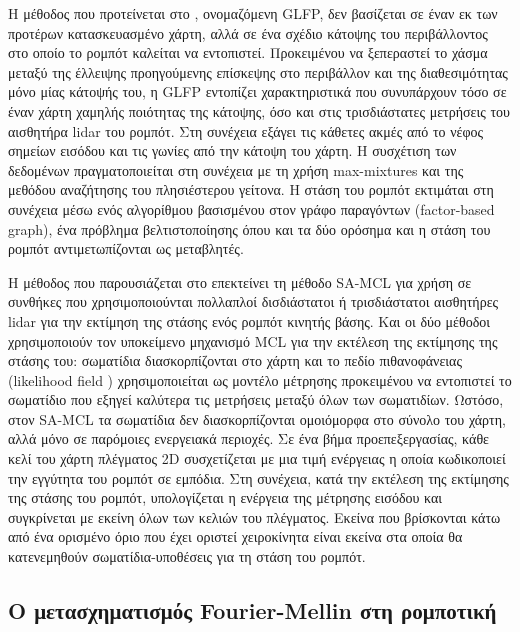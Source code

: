 Η μέθοδος που προτείνεται στο \cite{Wang2019a}, ονομαζόμενη GLFP, δεν βασίζεται
σε έναν εκ των προτέρων κατασκευασμένο χάρτη, αλλά σε ένα σχέδιο κάτοψης του
περιβάλλοντος στο οποίο το ρομπότ καλείται να εντοπιστεί. Προκειμένου να
ξεπεραστεί το χάσμα μεταξύ της έλλειψης προηγούμενης επίσκεψης στο περιβάλλον
και της διαθεσιμότητας μόνο μίας κάτοψής του, η GLFP εντοπίζει χαρακτηριστικά
που συνυπάρχουν τόσο σε έναν χάρτη χαμηλής ποιότητας της κάτοψης, όσο και στις
τρισδιάστατες μετρήσεις του αισθητήρα lidar του ρομπότ.  Στη συνέχεια εξάγει
τις κάθετες ακμές από το νέφος σημείων εισόδου και τις γωνίες από την κάτοψη
του χάρτη. Η συσχέτιση των δεδομένων πραγματοποιείται στη συνέχεια με τη χρήση
max-mixtures \cite{Olson2013} και της μεθόδου αναζήτησης του πλησιέστερου
γείτονα.  Η στάση του ρομπότ εκτιμάται στη συνέχεια μέσω ενός αλγορίθμου
βασισμένου στον γράφο παραγόντων (factor-based graph), ένα πρόβλημα
βελτιστοποίησης όπου και τα δύο ορόσημα και η στάση του ρομπότ αντιμετωπίζονται
ως μεταβλητές.

Η μέθοδος που παρουσιάζεται στο \cite{Yilmaz2019} επεκτείνει τη μέθοδο SA-MCL
\cite{Zhang2009} για χρήση σε συνθήκες που χρησιμοποιούνται πολλαπλοί
δισδιάστατοι ή τρισδιάστατοι αισθητήρες lidar για την εκτίμηση της στάσης ενός
ρομπότ κινητής βάσης. Και οι δύο μέθοδοι χρησιμοποιούν τον υποκείμενο μηχανισμό
MCL \cite{Gustafsson2002} για την εκτέλεση της εκτίμησης της στάσης του:
σωματίδια διασκορπίζονται στο χάρτη και το πεδίο πιθανοφάνειας (likelihood
field \cite{thrun2005probabilistic}) χρησιμοποιείται ως μοντέλο μέτρησης
προκειμένου να εντοπιστεί το σωματίδιο που εξηγεί καλύτερα τις μετρήσεις μεταξύ
όλων των σωματιδίων. Ωστόσο, στον SA-MCL τα σωματίδια δεν διασκορπίζονται
ομοιόμορφα στο σύνολο του χάρτη, αλλά μόνο σε παρόμοιες ενεργειακά περιοχές. Σε
ένα βήμα προεπεξεργασίας, κάθε κελί του χάρτη πλέγματος 2D συσχετίζεται με μια
τιμή ενέργειας η οποία κωδικοποιεί την εγγύτητα του ρομπότ σε εμπόδια. Στη
συνέχεια, κατά την εκτέλεση της εκτίμησης της στάσης του ρομπότ, υπολογίζεται η
ενέργεια της μέτρησης εισόδου και συγκρίνεται με εκείνη όλων των κελιών του
πλέγματος.  Εκείνα που βρίσκονται κάτω από ένα ορισμένο όριο που έχει οριστεί
χειροκίνητα είναι εκείνα στα οποία θα κατενεμηθούν σωματίδια-υποθέσεις για τη
στάση του ρομπότ.



\subsection{Ο μετασχηματισμός Fourier-Mellin στη ρομποτική}
\label{subsection:02_03_02:02}

